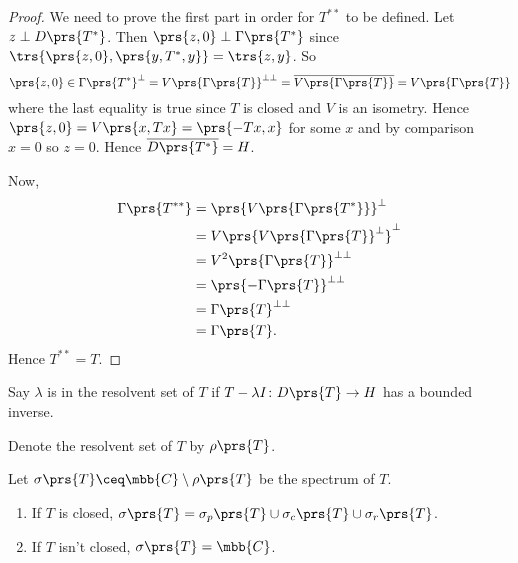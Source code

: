 \documentclass[10pt, twoside]{book}
\begin{document}
\begin{proof}
We need to prove the first part in order for $T^{**}$ to be defined.
Let $z \perp D\prs{T^*}$. Then $\prs{z, 0} \perp \Gamma\prs{T^*}$ since $\trs{\prs{z,0}, \prs{y, T^*, y}} = \trs{z,y}$. So \[\prs{z,0} \in \Gamma\prs{T^*}^\perp = V\prs{\Gamma\prs{T}}^{\perp \perp} = \overline{V\prs{\Gamma\prs{T}}} = V\prs{\Gamma\prs{T}}\]
where the last equality is true since $T$ is closed and $V$ is an isometry.
Hence $\prs{z,0} = V\prs{x, Tx} = \prs{-Tx, x}$ for some $x$ and by comparison $x = 0$ so $z = 0$. Hence $\overline{D\prs{T^*}} = H$.

Now,
\begin{align*}
\Gamma\prs{T^{**}} &= \prs{V\prs{\Gamma\prs{T^*}}}^\perp \\&= V\prs{V\prs{\Gamma\prs{T}}^\perp}^\perp \\&= V^2\prs{\Gamma\prs{T}}^{\perp \perp} \\&= \prs{-\Gamma\prs{T}}^{\perp \perp} \\&= \Gamma\prs{T}^{\perp \perp} \\&= \Gamma\prs{T} \text{.}
\end{align*}
Hence $T^{**} = T$.
\end{proof}

\begin{definition}
Say $\lambda$ is in the resolvent set of $T$ if $T - \lambda I \colon D\prs{T} \to H$ has a bounded inverse.

Denote the resolvent set of $T$ by $\rho\prs{T}$.
\end{definition}

\begin{definition}[Spectrum]
Let $\sigma\prs{T} \ceq \mbb{C} \setminus \rho\prs{T}$ be the spectrum of $T$.
\end{definition}

\begin{proposition}
\begin{enumerate}
\item If $T$ is closed, $\sigma\prs{T} = \sigma_p\prs{T} \cup \sigma_c\prs{T} \cup \sigma_r\prs{T}$.
\item If $T$ isn't closed, $\sigma\prs{T} = \mbb{C}$.
\end{enumerate}
\end{proposition}
\end{document}
